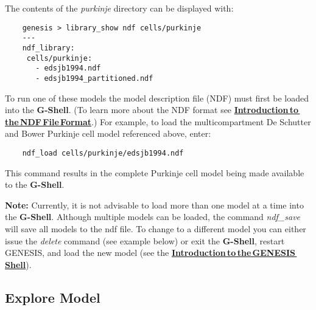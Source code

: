 \documentclass[12pt]{article}
\begin{document}
The contents of the {\it purkinje} directory can be displayed with:
\begin{verbatim}
    genesis > library_show ndf cells/purkinje
    ---
    ndf_library:
     cells/purkinje:
       - edsjb1994.ndf
       - edsjb1994_partitioned.ndf
\end{verbatim}

To run one of these models the model description file (NDF) must first be loaded into the {\bf G-Shell}.  (To learn more about the NDF format see  \href{../ndf-file-format/ndf-file-format.tex}{\bf Introduction\,to\,the\,NDF\,File\,Format}.) For example, to load the multicompartment De Schutter and Bower Purkinje cell model referenced above, enter:
\begin{verbatim}
    ndf_load cells/purkinje/edsjb1994.ndf
\end{verbatim}
This command results in the complete Purkinje cell model being made available to the {\bf G-Shell}.

{\bf Note:} Currently, it is not advisable to load more than one model at a time into the {\bf G-Shell}. Although multiple models can be loaded, the command {\it ndf\_save} will save all models to the ndf file. To change to a different model you can either issue the {\it delete} command (see example below) or exit the {\bf G-Shell}, restart GENESIS, and load the new model (see the \href{../gshell/gshell.tex}{\bf Introduction\,to\,the\,GENESIS\,Shell}).

\subsection*{Explore Model}
\end{document}
